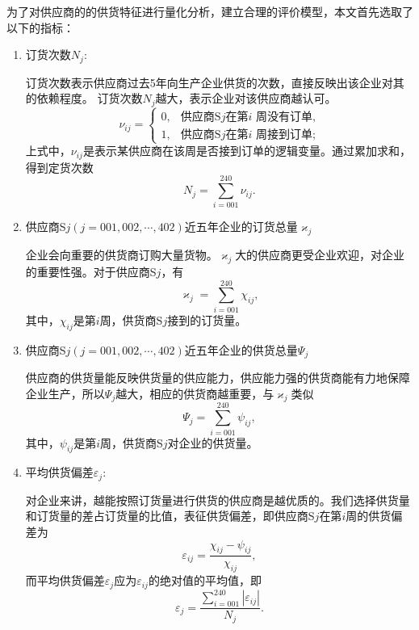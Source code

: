 为了对供应商的的供货特征进行量化分析，建立合理的评价模型，本文首先选取了以下的指标：
\begin{enumerate}

\item 订货次数$N_j$:

订货次数表示供应商过去5年向生产企业供货的次数，直接反映出该企业对其的依赖程度。
订货次数$N_j$越大，表示企业对该供应商越认可。
\begin{equation}
    \nu_{ij}=
\begin{cases}
0,& \text{供应商S$j$在第$i$ 周没有订单,}
\\
1,& \text{供应商S$j$在第$i$ 周接到订单;}
\end{cases}
\end{equation}
\noindent 上式中，$\nu_{ij}$是表示某供应商在该周是否接到订单的逻辑变量。通过累加求和，得到定货次数
\begin{equation}
    N_j=\sum_{i=001}^{240}\nu_{ij}.
\end{equation}

\item 供应商S$j(j=001,002,\cdots,402)$近五年企业的订货总量$\varkappa_j$

企业会向重要的供货商订购大量货物。$\varkappa_j$大的供应商更受企业欢迎，对企业的重要性强。对于供应商S$j$，有
\begin{equation}
    \varkappa_j=\sum_{i=001}^{240}\chi_{ij},
\end{equation}
其中，$\chi_{ij}$是第$i$周，供货商S$j$接到的订货量。

\item 供应商S$j(j=001,002,\cdots,402)$近五年企业的供货总量$\Psi_j$

供应商的供货量能反映供货量的供应能力，供应能力强的供货商能有力地保障企业生产，所以$\Psi_j$越大，相应的供货商越重要，与$\varkappa_j$类似
\begin{equation}
    \Psi_j=\sum_{i=001}^{240}\psi_{ij},
\end{equation}
其中，$\psi_{ij}$是第$i$周，供货商S$j$对企业的供货量。

\item 平均供货偏差$\varepsilon_j$:

对企业来讲，越能按照订货量进行供货的供应商是越优质的。我们选择供货量和订货量的差占订货量的比值，表征供货偏差，即供应商S$j$在第$i$周的供货偏差为
\begin{equation}
    \varepsilon_{ij}=\frac{\chi_{ij}-\psi_{ij}}{\chi_{ij}},
\end{equation}
而平均供货偏差$\varepsilon_j$应为$\varepsilon_{ij}$的绝对值的平均值，即
\begin{equation}
    \varepsilon_j=\frac{\sum_{i=001}^{240}|\varepsilon_{ij}|}{N_j}.
\end{equation}


\end{enumerate}
